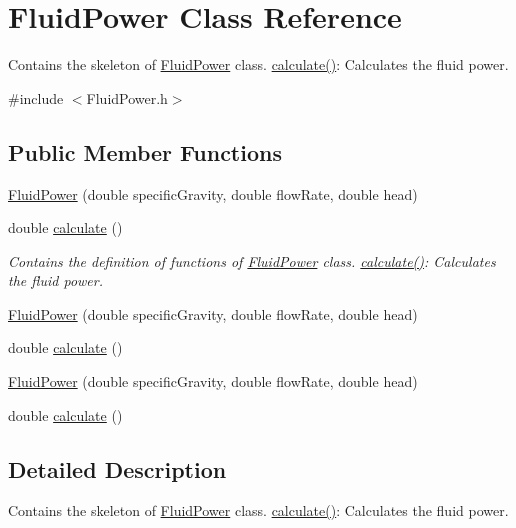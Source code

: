 \hypertarget{class_fluid_power}{}\section{Fluid\+Power Class Reference}
\label{class_fluid_power}


Contains the skeleton of \hyperlink{class_fluid_power}{Fluid\+Power} class. \hyperlink{class_fluid_power_a2691f6efdbd5e71aa91e087c6b1c197b}{calculate()}\+: Calculates the fluid power.  




{\ttfamily \#include $<$Fluid\+Power.\+h$>$}

\subsection*{Public Member Functions}
\begin{DoxyCompactItemize}
\item 
\hyperlink{class_fluid_power_a9bf61af202e27b9e41ed284b4b1643ee}{Fluid\+Power} (double specific\+Gravity, double flow\+Rate, double head)
\item 
double \hyperlink{class_fluid_power_a2691f6efdbd5e71aa91e087c6b1c197b}{calculate} ()
\begin{DoxyCompactList}\small\item\em Contains the definition of functions of \hyperlink{class_fluid_power}{Fluid\+Power} class. \hyperlink{class_fluid_power_a2691f6efdbd5e71aa91e087c6b1c197b}{calculate()}\+: Calculates the fluid power. \end{DoxyCompactList}\item 
\hyperlink{class_fluid_power_a9bf61af202e27b9e41ed284b4b1643ee}{Fluid\+Power} (double specific\+Gravity, double flow\+Rate, double head)
\item 
double \hyperlink{class_fluid_power_a2691f6efdbd5e71aa91e087c6b1c197b}{calculate} ()
\item 
\hyperlink{class_fluid_power_a9bf61af202e27b9e41ed284b4b1643ee}{Fluid\+Power} (double specific\+Gravity, double flow\+Rate, double head)
\item 
double \hyperlink{class_fluid_power_a2691f6efdbd5e71aa91e087c6b1c197b}{calculate} ()
\end{DoxyCompactItemize}


\subsection{Detailed Description}
Contains the skeleton of \hyperlink{class_fluid_power}{Fluid\+Power} class. \hyperlink{class_fluid_power_a2691f6efdbd5e71aa91e087c6b1c197b}{calculate()}\+: Calculates the fluid power. 

